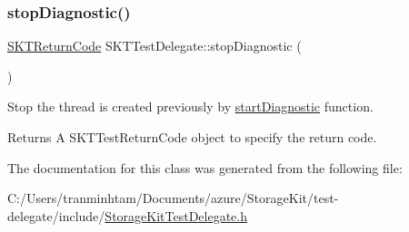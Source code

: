 \subsubsection{\texorpdfstring{stopDiagnostic()}{stopDiagnostic()}}
{\footnotesize\ttfamily \mbox{\hyperlink{_storage_kit_test_delegate_8h_a143844aea21c1ac420c1d0307a69deb7}{S\+K\+T\+Return\+Code}} S\+K\+T\+Test\+Delegate\+::stop\+Diagnostic (\begin{DoxyParamCaption}{ }\end{DoxyParamCaption})}



Stop the thread is created previously by \mbox{\hyperlink{class_s_k_t_test_delegate_a90d0c168749430e20f9bee211adc20da}{start\+Diagnostic}} function. 

\begin{DoxyReturn}{Returns}
A S\+K\+T\+Test\+Return\+Code object to specify the return code. 
\end{DoxyReturn}


The documentation for this class was generated from the following file\+:\begin{DoxyCompactItemize}
\item 
C\+:/\+Users/tranminhtam/\+Documents/azure/\+Storage\+Kit/test-\/delegate/include/\mbox{\hyperlink{_storage_kit_test_delegate_8h}{Storage\+Kit\+Test\+Delegate.\+h}}\end{DoxyCompactItemize}
